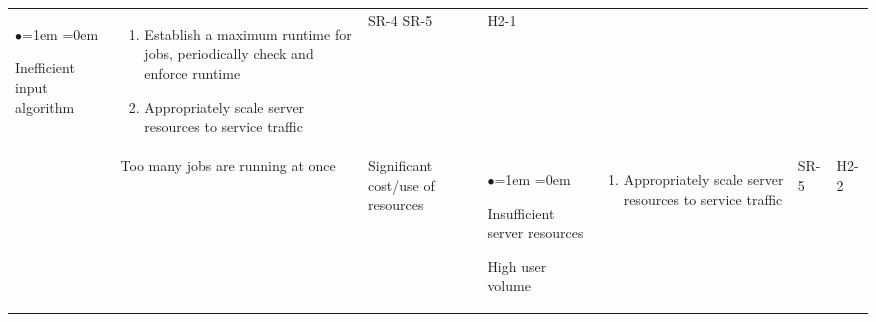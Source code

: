 \documentclass{article}
\begin{document}
\begin{table}[H]
\begin{tabularx}{\textwidth}{|P{2cm}|P{2cm}|P{2cm}|P{2cm}|P{3.45cm}|P{1cm}|P{1cm}|}
\begin{list}{$\bullet$}{\leftmargin=1em \itemindent=0em}
            \item Inefficient input algorithm
        \end{list}
        & 
        \begin{enumerate}[label=(\alph*)]{\leftmargin=1em \itemindent=0em}
            \item Establish a maximum runtime for jobs, periodically check and enforce runtime
            \item Appropriately scale server resources to service traffic
        \end{enumerate}
        & SR-4 SR-5 & H2-1\\
        & Too many jobs are running at once & Significant cost/use of resources & 
        \begin{list}{$\bullet$}{\leftmargin=1em \itemindent=0em}
            \item Insufficient server resources
            \item High user volume
        \end{list}
        & 
        \begin{enumerate}[label=(\alph*)]{\leftmargin=1em \itemindent=0em}
            \item Appropriately scale server resources to service traffic
        \end{enumerate}
        & SR-5 & H2-2\\
        \hline
    \end{tabularx}
\end{table}
\end{document}
